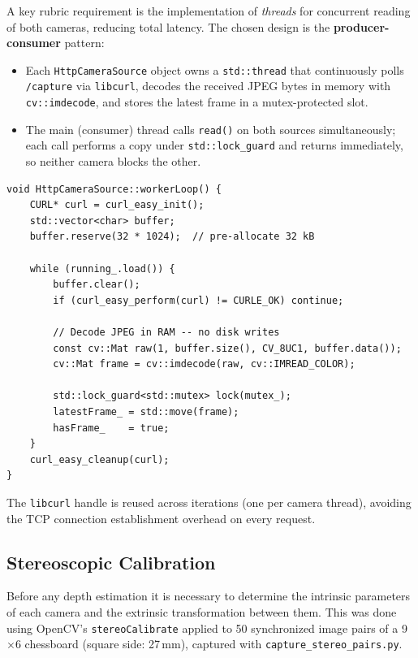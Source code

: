 \documentclass[12pt, a4paper]{article}
\begin{document}
A key rubric requirement is the implementation of \emph{threads} for concurrent reading
of both cameras, reducing total latency. The chosen design is the
\textbf{producer-consumer} pattern:

\begin{itemize}[leftmargin=2em]
  \item Each \texttt{HttpCameraSource} object owns a \texttt{std::thread} that
        continuously polls \texttt{/capture} via \texttt{libcurl}, decodes the received
        JPEG bytes in memory with \texttt{cv::imdecode}, and stores the latest frame in
        a mutex-protected slot.
  \item The main (consumer) thread calls \texttt{read()} on both sources simultaneously;
        each call performs a copy under \texttt{std::lock\_guard} and returns immediately,
        so neither camera blocks the other.
\end{itemize}

\begin{lstlisting}[style=cppstyle, caption={Producer thread loop in CameraSource.cpp (simplified).}]
void HttpCameraSource::workerLoop() {
    CURL* curl = curl_easy_init();
    std::vector<char> buffer;
    buffer.reserve(32 * 1024);  // pre-allocate 32 kB

    while (running_.load()) {
        buffer.clear();
        if (curl_easy_perform(curl) != CURLE_OK) continue;

        // Decode JPEG in RAM -- no disk writes
        const cv::Mat raw(1, buffer.size(), CV_8UC1, buffer.data());
        cv::Mat frame = cv::imdecode(raw, cv::IMREAD_COLOR);

        std::lock_guard<std::mutex> lock(mutex_);
        latestFrame_ = std::move(frame);
        hasFrame_    = true;
    }
    curl_easy_cleanup(curl);
}
\end{lstlisting}

The \texttt{libcurl} handle is reused across iterations (one per camera thread),
avoiding the TCP connection establishment overhead on every request.

\subsection{Stereoscopic Calibration}

Before any depth estimation it is necessary to determine the intrinsic parameters of
each camera and the extrinsic transformation between them.
This was done using OpenCV's \texttt{stereoCalibrate} applied to 50 synchronized
image pairs of a 9$\times$6 chessboard (square side: 27\,mm), captured with
\texttt{capture\_stereo\_pairs.py}.
\end{document}
